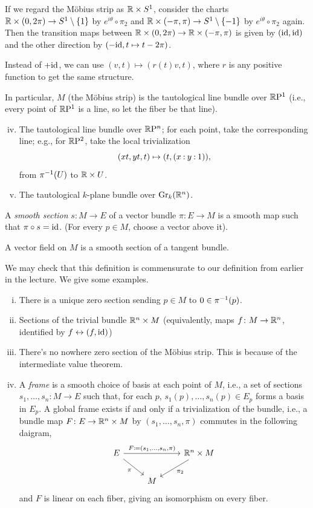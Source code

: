 If we regard the M\"obius strip as $\mathbb R \times S^1$, consider the charts $\mathbb R \times (0, 2\pi) \to S^1 \setminus \{1\}$ by $e^{i\theta} \circ \pi_2$ and $\mathbb R \times (-\pi, \pi) \to S^1 \setminus \{-1\}$ by $e^{i\theta} \circ \pi_2$ again. Then the transition maps between $\mathbb R \times (0, 2\pi) \to \mathbb R \times (-\pi, \pi)$ is given by $(\mathrm{id}, \mathrm{id})$ and the other direction by $(-\mathrm{id}, t \mapsto t - 2\pi)$. \vspace{-14pt}
\begin{remark}
    Instead of $+\mathrm{id}$, we can use $(v, t) \mapsto (r(t) v, t)$, where $r$ is any positive function to get the same structure.
\end{remark}
In particular, $M$ (the M\"obius strip) is the tautological line bundle over $\mathbb{R}\mathrm{P}^1$ (i.e., every point of $\mathbb{R}\mathrm{P}^1$ is a line, so let the fiber be that line).
\begin{enumerate}[(i)] \setcounter{enumi}{3}
    \item The tautological line bundle over $\mathbb{R}\mathrm{P}^n$; for each point, take the corresponding line; e.g., for $\mathbb{R}\mathrm{P}^2$, take the local trivialization
    \[ (xt, yt, t) \mapsto (t, \pcoor{x:y:1}), \]
    from $\pi^{-1}(U)$ to $\mathbb R \times U$.
    \item The tautological $k$-plane bundle over $\mathrm{Gr}_k(\mathbb R^n)$.
\end{enumerate}
\begin{definition}
    A \textit{smooth section} $s \colon M \to E$ of a vector bundle $\pi \colon E \to M$ is a smooth map such that $\pi \circ s = \mathrm{id}$. (For every $p \in M$, choose a vector above it).
\end{definition}
\begin{definition}
    A vector field on $M$ is a smooth section of a tangent bundle.
\end{definition}
We may check that this definition is commensurate to our definition from earlier in the lecture. We give some examples.
\begin{enumerate}[(i)]
    \item There is a unique zero section sending $p \in M$ to $0 \in \pi^{-1}(p)$.
    \item Sections of the trivial bundle $\mathbb R^n \times M$ (equivalently, maps $f \colon M \to \mathbb R^n$, identified by $f \leftrightarrow (f, \mathrm{id})$)
    \item There's no nowhere zero section of the M\"obius strip. This is because of the intermediate value theorem.
    \item A \textit{frame} is a smooth choice of basis at each point of $M$, i.e., a set of sections $s_1, \dots, s_n \colon M \to E$ such that, for each $p$, $s_1(p), \dots, s_n(p) \in E_p$ forms a basis in $E_p$. A global frame exists if and only if a trivialization of the bundle, i.e., a bundle map $F \colon E \to \mathbb R^n \times M$ by $(s_1, \dots, s_n, \pi)$ commutes in the following daigram,
    \[ \begin{tikzcd} E \arrow[rr, "F \coloneq (s_1{,} \dots {,} s_n{,} \pi)"] \arrow[dr, "\pi"'] & & \RR^n \times M \arrow[dl, "\pi_2"] \\ & M \end{tikzcd} \]
    and $F$ is linear on each fiber, giving an isomorphism on every fiber.
\end{enumerate}